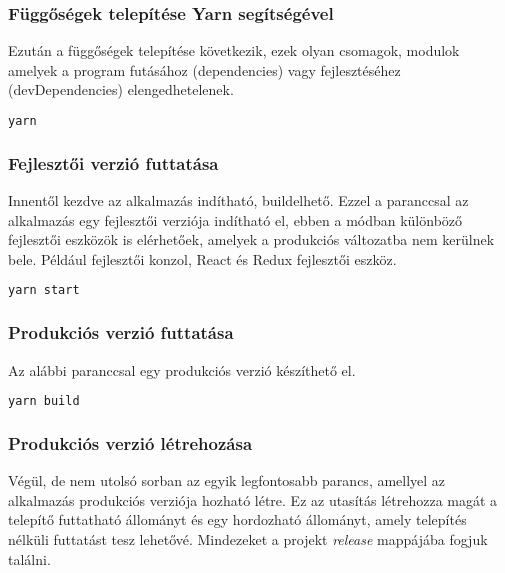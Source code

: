 \subsubsection{Függőségek telepítése Yarn segítségével}
Ezután a függőségek telepítése következik, ezek olyan csomagok, modulok amelyek a program futásához (dependencies) vagy fejlesztéséhez (devDependencies) elengedhetelenek.
\begin{lstlisting}[language={Bash}, numbers={none}]
    yarn
\end{lstlisting}

\subsubsection{Fejlesztői verzió futtatása}
Innentől kezdve az alkalmazás indítható, buildelhető. Ezzel a paranccsal az alkalmazás egy fejlesztői verziója indítható el, ebben a módban különböző fejlesztői eszközök is elérhetőek, amelyek a produkciós változatba nem kerülnek bele. Például fejlesztői konzol, React és Redux fejlesztői eszköz.
\begin{lstlisting}[language={Bash}, numbers={none}]
    yarn start
\end{lstlisting}

\subsubsection{Produkciós verzió futtatása}
Az alábbi paranccsal egy produkciós verzió készíthető el.
\begin{lstlisting}[language={Bash}, numbers={none}]
    yarn build
\end{lstlisting}

\subsubsection{Produkciós verzió létrehozása}
Végül, de nem utolsó sorban az egyik legfontosabb parancs, amellyel az alkalmazás produkciós verziója hozható létre. Ez az utasítás létrehozza magát a telepítő futtatható állományt és egy hordozható állományt, amely telepítés nélküli futtatást tesz lehetővé. Mindezeket a projekt {\it release} mappájába fogjuk találni.

